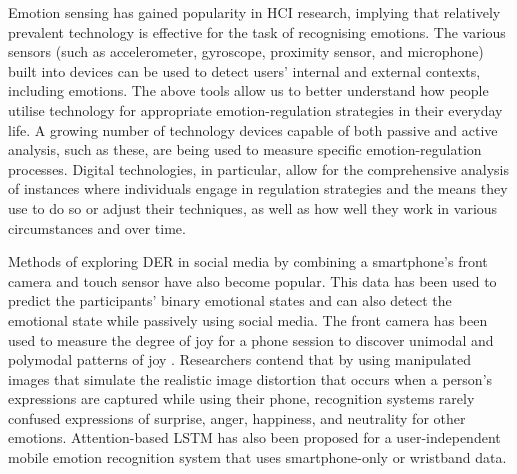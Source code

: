 \documentclass[lettersize,journal]{IEEEtran}
\begin{document}

Emotion sensing has gained popularity in HCI research, implying that relatively prevalent technology is effective for the task of recognising emotions. The various sensors (such as accelerometer, gyroscope, proximity sensor, and microphone) built into devices can be used to detect users' internal and external contexts, including emotions. The above tools allow us to better understand how people utilise technology for appropriate emotion-regulation strategies in their everyday life. A growing number of technology devices capable of both passive and active analysis, such as these, are being used to measure specific emotion-regulation processes. Digital technologies, in particular, allow for the comprehensive analysis of instances where individuals engage in regulation strategies and the means they use to do so or adjust their techniques, as well as how well they work in various circumstances and over time. 




Methods of exploring DER in social media by combining a smartphone's front camera and touch sensor have also become popular. This data has been used to predict the participants' binary emotional states and can also detect the emotional state while passively using social media. The front camera has been used to measure the degree of joy for a phone session to discover unimodal and polymodal patterns of joy \cite{tag2022emotion}. Researchers contend that by using manipulated images that simulate the realistic image distortion that occurs when a person's expressions are captured while using their phone, recognition systems rarely confused expressions of surprise, anger, happiness, and neutrality for other emotions. Attention-based LSTM has also been proposed for a user-independent mobile emotion recognition system that uses smartphone-only or wristband data.
\end{document}
